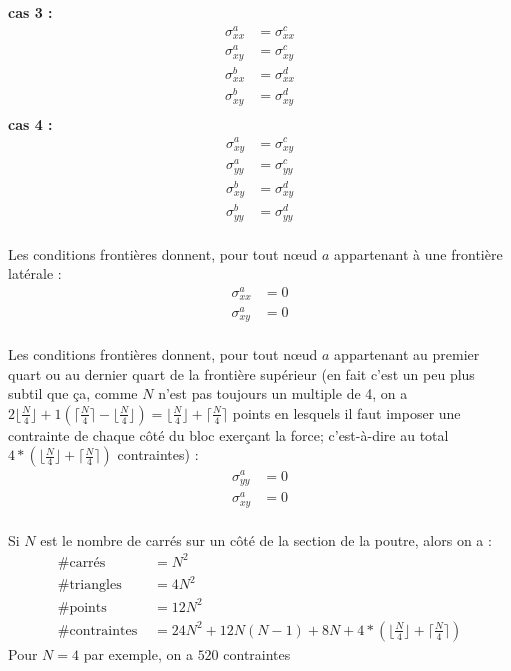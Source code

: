 \textbf{cas 3 :}
\begin{align*}
\sigma_{xx}^a &= \sigma_{xx}^c \\
 \sigma_{xy}^a  &= \sigma_{xy}^c \\
 \sigma_{xx}^b&= \sigma_{xx}^d\\
 \sigma_{xy}^b &= \sigma_{xy}^d  \\
\end{align*}
\textbf{cas 4 :}
\begin{align*}
\sigma_{xy}^a &= \sigma_{xy}^c \\
\sigma_{yy}^a &=  \sigma_{yy}^c \\
\sigma_{xy}^b &= \sigma_{xy}^d \\
\sigma_{yy}^b &= \sigma_{yy}^d \\
\end{align*}

Les conditions frontières donnent, pour tout nœud $a$ appartenant à une frontière latérale : 
\begin{align*}
\sigma_{xx}^a&= 0\\
 \sigma_{xy}^a &= 0  \\
\end{align*}

Les conditions frontières donnent, pour tout nœud $a$ appartenant au premier quart ou au dernier quart de la frontière supérieur (en fait c'est un peu plus subtil que ça, comme $N$ n'est pas toujours un multiple de 4, on a $2\lfloor \frac{N}{4} \rfloor + 1 \left( \lceil \frac{N}{4} \rceil - \lfloor \frac{N}{4} \rfloor \right) = \lfloor \frac{N}{4} \rfloor + \lceil \frac{N}{4} \rceil$ points en lesquels il faut imposer une contrainte de chaque côté du bloc exerçant la force; c'est-à-dire au total $4*\left(  \lfloor \frac{N}{4} \rfloor + \lceil \frac{N}{4} \rceil \right)$ contraintes) : 
\begin{align*}
\sigma_{yy}^a&= 0\\
 \sigma_{xy}^a &= 0  \\
\end{align*}


Si $N$ est le nombre de carrés sur un côté de la section de la poutre, alors on a :
\begin{align*}
\text{\# carrés  } &= N^2\\
\text{\# triangles  } &= 4N^2\\
\text{\# points  } &= 12 N^2\\
\text{\# contraintes  } &= 24N^2+12N(N-1)+8N + 4*\left(  \lfloor \frac{N}{4} \rfloor + \lceil \frac{N}{4} \rceil \right)
\end{align*}
Pour $N=4$ par exemple, on a $520$ contraintes
